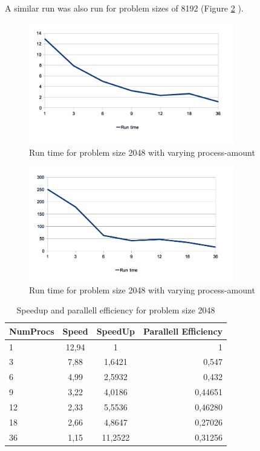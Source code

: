 A similar run was also run for problem sizes of 8192 (Figure \ref{numprocs8192} ).

\begin{figure}[H]
  \centering
    \includegraphics[width=0.8\textwidth]{RunTimePerProcess2048.png}
    \caption{Run time for problem size 2048 with varying process-amount}
    \label{numprocs2048}
\end{figure}

\begin{figure}[t]
  \centering
    \includegraphics[width=0.8\textwidth]{RunTimePerProcess8192.png}
    \caption{Run time for problem size 2048 with varying process-amount}
    \label{numprocs8192}
\end{figure}

\begin{table}[ht]
    \begin{tabular}{l | c | c | r}
        NumProcs & Speed & SpeedUp & Parallell Efficiency \\
        \hline
        1 & 12,94 & 1 & 1 \\
        3 & 7,88 & 1,6421 & 0,547 \\
        6 & 4,99 & 2,5932 & 0,432 \\
        9 & 3,22 & 4,0186 & 0,44651 \\
        12 & 2,33 & 5,5536 & 0,46280 \\
        18 & 2,66 & 4,8647 & 0,27026 \\
        36 & 1,15 & 11,2522 & 0,31256 \\
        \hline
    \end{tabular}
    \caption{Speedup and parallell efficiency for problem size 2048}
\end{table}

